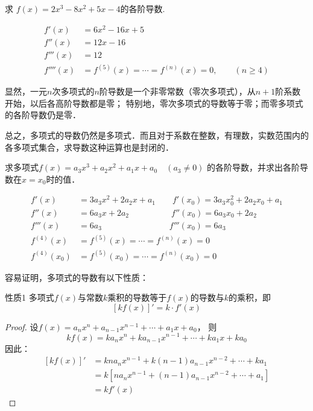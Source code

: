    \begin{example}
    求 $f(x)=2x^3-8x^2+5x-4$的各阶导数.
    \end{example}

    \begin{solution}
\[\begin{split}
    f' (x) &=6x^2-16x+5\\
        f'' (x) &=12x-16\\
        f''' (x) &=12\\
        f'''' (x) &=f^{(5)}(x)=\cdots =f^{(n)}(x)=0,\qquad (n\ge 4)
\end{split}\]
    \end{solution}    

    显然，一元$n$次多项式的$n$阶导数是一个非零常数（零次多项式），从$n+1$阶系数开始，以后各高阶导数都是零；
    特别地，零次多项式的导数等于零；而零多项式的各阶导数仍是零．

    总之，多项式的导数仍然是多项式．而且对于系数在整数，有理数，实数范围内的各多项式集合，求导数这种运算也是封闭的．

 
    \begin{example}
求多项式$f (x) =a_3x^3+a_2x^2+a_1x+a_0\quad  (a_3\ne 0)$ 的各阶导数，并求出各阶导数在$x=x_0$时的值．          
    \end{example}           
         
    \begin{solution}
\[\begin{split}
 f'(x)&=3a_3x^2+2a_2x+a_1\qquad 
    f' (x_0) =3a_3 x^2_0 +2a_2x_0+a_1\\
    f'' (x) &=6a_3x+2a_2\qquad \qquad \quad 
    f'' (x_0) =6a_3x_0+2a_2\\
    f''' (x) &=6a_3\qquad \qquad \qquad \qquad 
     f''' (x_0 ) =6a_3\\
     f^{(4)} (x)&=f^{(5)}(x)=\cdots =f^{(n)}(x)=0\\
     f^{(4)}  (x_0)&=f^{(5)}(x_0)=\cdots =f^{(n)}(x_0)=0 
\end{split}\] 
    \end{solution} 

容易证明，多项式的导数有以下性质：

\begin{blk}{性质1}
    多项式$f(x)$与常数$k$乘积的导数等于$f(x)$的导数与$k$的乘积，即
\[[kf (x) ]'=k\cdot f' (x) \]
\end{blk}   

\begin{proof}
设$f(x)=a_nx^n+a_{n-1}x^{n-1}+\cdots+a_1x+a_0$，
则
\[kf(x)=ka_nx^n+ka_{n-1}x^{n-1}+\cdots+ka_1x+ka_0\]
因此：
\[\begin{split}
    [kf(x)]'&=kna_nx^{n-1}+k(n - 1)a_{n-1}x^{n-2}+\cdots+ka_1\\
&=k \left[na_nx^{n-1}+(n - 1)a_{n-1}x^{n-2}+\cdots+a_1\right]\\
&=kf' (x) 
\end{split}\]
\end{proof}

